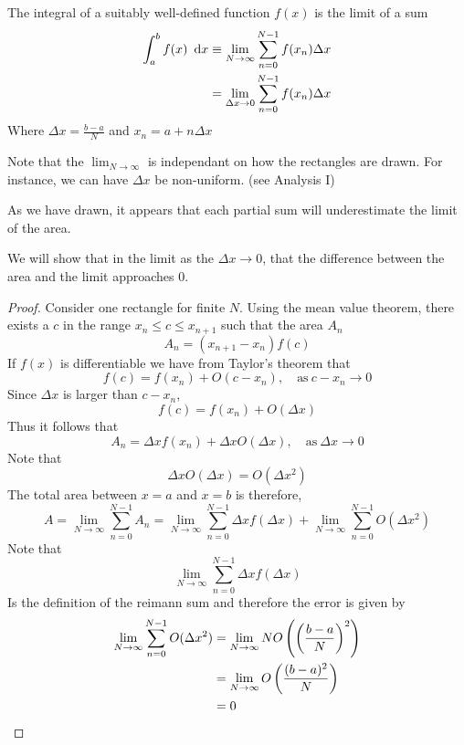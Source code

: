 \documentclass{article}
\begin{document}
\begin{defi}[Integral]
    The integral of a suitably well-defined function $f(x)$ is the limit of a sum
    \begin{align*}
        \int_{a}^{b}{f(x) \ \mathop{}\!\mathrm{d} x} &\equiv \lim_{N \rightarrow \infty}{\sum_{n=0}^{N-1}{f(x_n)\Delta x}} \\
        &= \lim_{\Delta x \rightarrow 0}{\sum_{n=0}^{N-1}{f(x_n)\Delta x}}
    \end{align*}
    Where $\Delta x = \frac{b - a}{N}$ and $x_n = a + n\Delta x$
    
    Note that the $\lim_{N \rightarrow \infty}$ is independant on how the rectangles are drawn. For instance, we can have $\Delta x$ be non-uniform. (see Analysis I)
\end{defi}

As we have drawn, it appears that each partial sum will underestimate the limit of the area.
\begin{prop}
    We will show that in the limit as the $\Delta x \rightarrow 0$, that the difference between the area and the limit approaches $0$.
\end{prop}
\begin{proof}
    Consider one rectangle for finite $N$. 
    Using the mean value theorem, there exists a $c$ in the range $x_n \leq c \leq x_{n+1}$ such that the area $A_n$
    \[
        A_n = (x_{n+1} - x_n)f(c)  
    \]
    If $f(x)$ is differentiable we have from Taylor's theorem that
    \[
        f(c) = f(x_n) + O(c - x_n), \quad \text{as} \ c-x_n \rightarrow 0  
    \]
    Since $\Delta x$ is larger than $c - x_n$,
    \[
        f(c) = f(x_n) + O(\Delta x)
    \]
    Thus it follows that
    \[
        A_n =  \Delta x f(x_n) + \Delta x O(\Delta x), \quad \text{as} \ \Delta x \rightarrow 0 
    \]
    Note that
    \[
        \Delta x O(\Delta x) = O(\Delta x^2)
    \]
    The total area between $x=a$ and $x=b$ is therefore,
    \[
        A = \lim_{N \rightarrow \infty}{\sum_{n=0}^{N-1}{A_n}} = \lim_{N \rightarrow \infty}{\sum_{n=0}^{N-1}{\Delta x f(\Delta x)}} + \lim_{N \rightarrow \infty}{\sum_{n=0}^{N-1}{O(\Delta x^2)}}
    \]
    Note that
    \[
        \lim_{N \rightarrow \infty}{\sum_{n=0}^{N-1}{\Delta x f(\Delta x)}}
    \]
    Is the definition of the reimann sum and therefore the error is given by
    \begin{align*}
        \lim_{N \rightarrow \infty}{\sum_{n=0}^{N-1}{O(\Delta x^2)}} &= \lim_{N \rightarrow \infty}{NO \left( \left( \frac{b-a}{N} \right)^2 \right)} \\
        &= \lim_{N \rightarrow \infty}{O\left( \frac{(b-a)^2}{N} \right)} \\
        &= 0
    \end{align*}
\end{proof}
\end{document}
